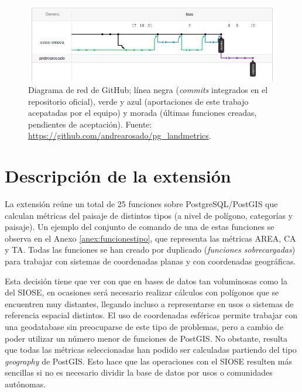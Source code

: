 \begin{figure}
\begin{center}
\includegraphics[width=\textwidth]{ResultadosyDiscusion/Figs/network.png}
\caption{Diagrama de red de GitHub; línea negra (\textit{commits} integrados en el repositorio oficial), verde y azul (aportaciones de este trabajo acepatadas por el equipo) y morada (últimas funciones creadas, pendientes de aceptación). Fuente: \url{https://github.com/andrearosado/pg_landmetrics}. \label{fig:network}}
\end{center}
\end{figure}

\section{Descripción de la extensión \pgland{} \label{sec:extension}}

La extensión \pgland{} reúne  un total de 25 funciones sobre PostgreSQL/PostGIS que calculan métricas del paisaje de distintos tipos (a nivel de polígono, categorías y paisaje). Un ejemplo del conjunto de comando de una de estas funciones se observa en el Anexo \ref{anex:funcionestipo}, que representa las métricas AREA, CA y TA. Todas las funciones se han creado por duplicado (\textit{funciones sobrecargadas}) para trabajar con sistemas de coordenadas planas y con coordenadas geográficas. 

Esta decisión tiene que ver con que en bases de datos tan voluminosas como la del SIOSE, en ocasiones será necesario realizar cálculos con polígonos que se encuentren muy distantes, llegando incluso a representarse en usos o sistemas de referencia espacial distintos. El uso de coordenadas esféricas permite trabajar con una geodatabase sin preocuparse de este tipo de problemas, pero a cambio de poder utilizar un número menor de funciones de PostGIS. No obstante, resulta que todas las métricas seleccionadas han podido ser calculadas partiendo del tipo \textit{geography} de PostGIS. Esto hace que las operaciones con el SIOSE resulten más sencillas si no es necesario dividir la base de datos por usos o comunidades autónomas.

